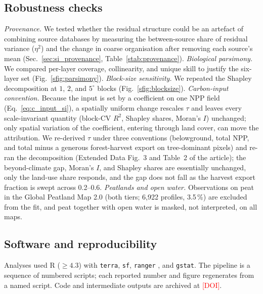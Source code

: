 \documentclass[12pt, a4paper]{article}
\newcommand{\PH}[1]{\textcolor{red}{#1}}
\begin{document}
\subsection{Robustness checks}
\label{sec:si_robust}
\emph{Provenance.} We tested whether the residual structure could be an artefact of
combining source databases by measuring the between-source share of residual variance
($\eta^2$) and the change in coarse organisation after removing each source's mean
(Sec.~\ref{sec:si_provenance}, Table~\ref{stab:provenance}).
\emph{Biological parsimony.} We compared per-layer coverage, collinearity, and unique
skill to justify the six-layer set (Fig.~\ref{sfig:parsimony}).
\emph{Block-size sensitivity.} We repeated the Shapley decomposition at $1$, $2$, and
$5^{\circ}$ blocks (Fig.~\ref{sfig:blocksize}).
\emph{Carbon-input convention.} Because the input is set by a coefficient on one NPP
field (Eq.~\ref{eq:c_input_si}), a spatially uniform change rescales $\tau$ and leaves
every scale-invariant quantity (block-CV $R^2$, Shapley shares, Moran's $I$) unchanged;
only spatial variation of the coefficient, entering through land cover, can move the
attribution. We re-derived $\tau$ under three conventions (belowground, total NPP, and
total minus a generous forest-harvest export on tree-dominant pixels) and re-ran the
decomposition (Extended Data Fig.~3 and Table~2 of the article); the beyond-climate gap,
Moran's $I$, and Shapley shares are essentially unchanged, only the land-use share
responds, and the gap does not fall as the harvest export fraction is swept across
0.2--0.6.
\emph{Peatlands and open water.} Observations on peat in the Global Peatland Map 2.0
\citep{GreifswaldGPM2022} (both tiers; 6{,}922 profiles, 3.5\,\%) are excluded from the
fit, and peat together with open water is masked, not interpreted, on all maps.

\subsection{Software and reproducibility}
Analyses used R ($\geq4.3$) with \texttt{terra}, \texttt{sf}, \texttt{ranger}
\citep{Wright2017}, and \texttt{gstat}. The pipeline is a sequence of numbered scripts;
each reported number and figure regenerates from a named script. Code and intermediate
outputs are archived at \PH{[DOI]}.

\end{document}
